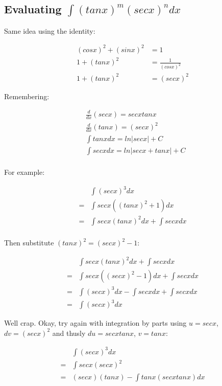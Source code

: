 \documentclass{article}
\begin{document}
\newpage

\subsection{Evaluating $\int (tanx)^m (secx)^ndx$}

Same idea using the identity:

\begin{align*}
  (cosx)^2 + (sinx)^2 &= 1 \\
  1 + (tanx)^2 &= \frac{1}{(cosx)^2} \\
  1 + (tanx)^2 &= (secx)^2
\end{align*}

Remembering:

\begin{align*}
  &\frac{d}{dx} (secx) = secx tanx \\
  &\frac{d}{dx} (tanx) = (secx)^2 \\
  &\int tanx dx = ln \left| secx \right| + C \\
  &\int secx dx = ln \left| secx + tanx \right| + C \\
\end{align*}  

For example:

\begin{align*}
  &\int (secx)^3 dx \\
  = &\int secx ((tanx)^2 + 1) dx \\
  = &\int secx (tanx)^2 dx + \int secx dx \\
\end{align*}

Then substitute $(tanx)^2 = (secx)^2 - 1$:

\begin{align*}
  &\int secx (tanx)^2 dx + \int secx dx \\
  = &\int secx ((secx)^2 -1) dx + \int secx dx \\
  = &\int (secx)^3 dx - \int secx dx + \int secx dx \\
  = &\int (secx)^3 dx
\end{align*}

\newpage

Well crap.  Okay, try again with integration by parts using $u =
secx$, $dv = (secx)^2$ and thusly $du = secx tanx$, $v = tanx$:

\begin{align*}
  &\int (secx)^3 dx \\
  = &\int secx (secx)^2 \\
  = &(secx)(tanx) - \int tanx (secx tanx) dx
\end{align*}
\end{document}
